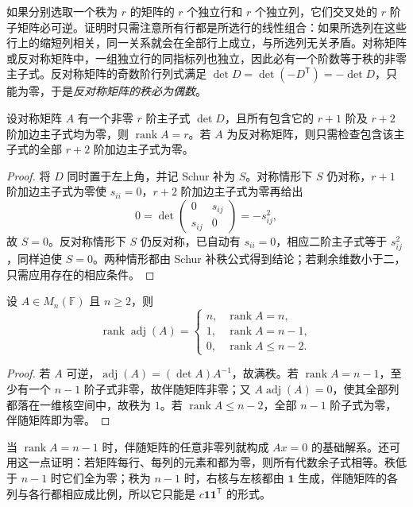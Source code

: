 如果分别选取一个秩为 $r$ 的矩阵的 $r$ 个独立行和 $r$ 个独立列，它们交叉处的 $r$ 阶子矩阵必可逆。证明时只需注意所有行都是所选行的线性组合：如果所选列在这些行上的缩短列相关，同一关系就会在全部行上成立，与所选列无关矛盾。对称矩阵或反对称矩阵中，一组独立行的同指标列也独立，因此必有一个阶数等于秩的非零主子式。反对称矩阵的奇数阶行列式满足 $\det D=\det(-D^{\mathsf T})=-\det D$，只能为零，于是\emph{反对称矩阵的秩必为偶数}。

\begin{proposition}
\label{prop:laex-principal-border}
设对称矩阵 $A$ 有一个非零 $r$ 阶主子式 $\det D$，且所有包含它的 $r+1$ 阶及 $r+2$ 阶加边主子式均为零，则 $\operatorname{rank}A=r$。若 $A$ 为反对称矩阵，则只需检查包含该主子式的全部 $r+2$ 阶加边主子式为零。
\end{proposition}

\begin{proof}
将 $D$ 同时置于左上角，并记 Schur 补为 $S$。对称情形下 $S$ 仍对称，$r+1$ 阶加边主子式为零使 $s_{ii}=0$，$r+2$ 阶加边主子式为零再给出
\[
0=\det\begin{pmatrix}0&s_{ij}\\s_{ij}&0\end{pmatrix}=-s_{ij}^2,
\]
故 $S=0$。反对称情形下 $S$ 仍反对称，已自动有 $s_{ii}=0$，相应二阶主子式等于 $s_{ij}^2$，同样迫使 $S=0$。两种情形都由 Schur 补秩公式得到结论；若剩余维数小于二，只需应用存在的相应条件。
\end{proof}

\begin{proposition}
\label{prop:laex-adjugate-rank}
设 $A\in M_n(\mathbb F)$ 且 $n\ge2$，则
\[
\operatorname{rank}\operatorname{adj}(A)=
\begin{cases}
n,&\operatorname{rank}A=n,\\
1,&\operatorname{rank}A=n-1,\\
0,&\operatorname{rank}A\le n-2.
\end{cases}
\]
\end{proposition}

\begin{proof}
若 $A$ 可逆，$\operatorname{adj}(A)=(\det A)A^{-1}$，故满秩。若 $\operatorname{rank}A=n-1$，至少有一个 $n-1$ 阶子式非零，故伴随矩阵非零；又 $A\operatorname{adj}(A)=0$，使其全部列都落在一维核空间中，故秩为 $1$。若 $\operatorname{rank}A\le n-2$，全部 $n-1$ 阶子式为零，伴随矩阵即为零。
\end{proof}

当 $\operatorname{rank}A=n-1$ 时，伴随矩阵的任意非零列就构成 $Ax=0$ 的基础解系。还可用这一点证明：若矩阵每行、每列的元素和都为零，则所有代数余子式相等。秩低于 $n-1$ 时它们全为零；秩为 $n-1$ 时，右核与左核都由 $\mathbf1$ 生成，伴随矩阵的各列与各行都相应成比例，所以它只能是 $c\mathbf1\mathbf1^{\mathsf T}$ 的形式。

